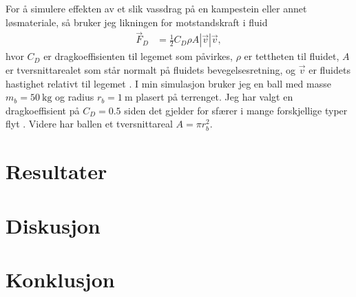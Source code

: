 \documentclass[norsk, doc, 12pt, a4paper]{apa7}  %
\begin{document}
For å simulere effekten av et slik vassdrag på en kampestein eller annet løsmateriale, så bruker jeg likningen for motstandskraft i fluid
\begin{align*}
	\vec{F}_{D} &= \frac{1}{2}C_{D}\rho A |\vec{v}|\vec{v},
\end{align*}
hvor \(C_{D}\) er dragkoeffisienten til legemet som påvirkes, \(\rho\) er tettheten til fluidet, \(A\) er tversnittarealet som står normalt på fluidets bevegelsesretning, og \(\vec{v}\) er fluidets hastighet relativt til legemet \parencite[s.7]{alexanderMovingBouldersFlash2016}. I min simulasjon bruker jeg en ball med masse \(m_{b} = \SI{50}{\kilogram}\) og radius \(r_{b} = \SI{1}{\metre}\) plasert på terrenget. Jeg har valgt en dragkoeffisient på \(C_{D} = 0.5\) siden det gjelder for sfærer i mange forskjellige typer flyt \parencite{hallDragSphere2023}. Videre har ballen et tversnittareal \(A = \pi r_{b}^{2}\).


\section{Resultater}
\section{Diskusjon}
\section{Konklusjon}

\printbibliography
\end{document}
